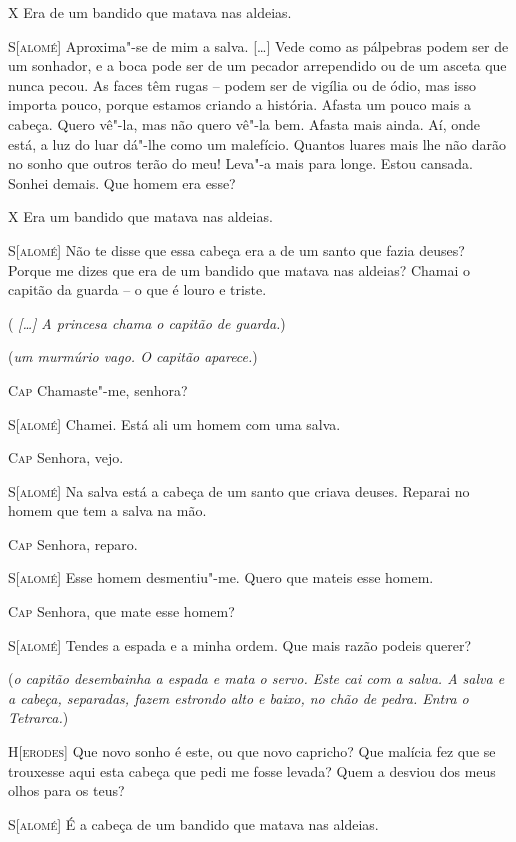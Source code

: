 \textsc{X} Era de um bandido que matava nas aldeias.

\textsc{S[alomé]} Aproxima"-se de mim a salva. [\ldots{}] Vede como as pálpebras
podem ser de um sonhador, e a boca pode ser de um pecador arrependido
ou de um asceta que nunca pecou. As faces têm rugas -- podem ser de
vigília ou de ódio, mas isso importa pouco, porque estamos criando a
história. Afasta um pouco mais a cabeça. Quero vê"-la, mas não quero
vê"-la bem. Afasta mais ainda. Aí, onde está, a luz do luar dá"-lhe
como um malefício. Quantos luares mais lhe não darão no sonho que
outros terão do meu! Leva"-a mais para longe. Estou cansada. Sonhei
demais. Que homem era esse? 

\textsc{X} Era um bandido que matava nas aldeias.

\textsc{S[alomé]} Não te disse que essa cabeça era a de um santo que fazia
deuses? Porque me dizes que era de um bandido que matava nas aldeias?
Chamai o capitão da guarda -- o que é louro e triste.


(\textit{ \emph{[\ldots{}]} A princesa chama o capitão de guarda.}) 

(\textit{um murmúrio vago. O capitão aparece.}) 

\textsc{Cap} Chamaste"-me, senhora?

\textsc{S[alomé]} Chamei. Está ali um homem com uma salva.

\textsc{Cap} Senhora, vejo.

\textsc{S[alomé]} Na salva está a cabeça de um santo que criava deuses.
Reparai no homem que tem a salva na mão. 

\textsc{Cap} Senhora, reparo.

\textsc{S[alomé]} Esse homem desmentiu"-me. Quero que mateis esse homem.

\textsc{Cap} Senhora, que mate esse homem?

\textsc{S[alomé]} Tendes a espada e a minha ordem. Que mais razão podeis
querer?

(\textit{o capitão desembainha a espada e mata o servo. Este cai com a
 salva. A salva e a cabeça, separadas, fazem estrondo alto e baixo, no
 chão de pedra. Entra o Tetrarca.}) 

\textsc{H[erodes]} Que novo sonho é este, ou que novo capricho? Que malícia
fez que se trouxesse aqui esta cabeça que pedi me fosse levada? Quem
a desviou dos meus olhos para os teus?

\textsc{S[alomé]} É a cabeça de um bandido que matava nas aldeias.

